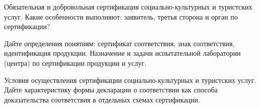 \documentclass[
	14pt,
	a4paper,
	]
	{scrartcl}
\begin{document}
\vfill
\z Обязательная и добровольная сертификация социально-культурных и туристских услуг.
 \vfill
\z Какие особенности выполняют: заявитель, третья сторона и орган по сертификации?
 \vfill

\vfill

\newpage


\shapk
{}
\setcounter{zad}{0}

\vfill
\z Дайте определения понятиям: сертификат соответствия, знак соответствия, идентификация продукции. 
 \vfill
\z Назначение и задачи испытательной лаборатории (центра) по сертификации продукции и услуг.
 \vfill

\vfill

\newpage


\shapk
{}
\setcounter{zad}{0}

\vfill
\z Условия осуществления сертификации социально-культурных и туристских услуг.
 \vfill
\z Дайте характеристику формы декларации о соответствии как способа доказательства соответствия в отдельных схемах сертификации.
 \vfill

\vfill

\newpage
\end{document}
